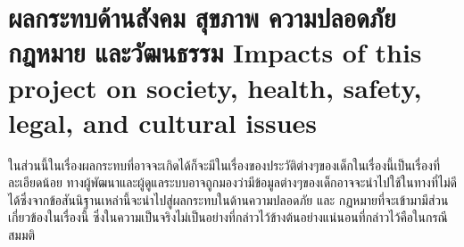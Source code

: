 \section{\ifcpe%
ผลกระทบด้านสังคม สุขภาพ ความปลอดภัย กฎหมาย และวัฒนธรรม
\else%
Impacts of this project on society, health, safety, legal, and cultural issues
\fi}

ในส่วนนี้ในเรื่องผลกระทบที่อาจจะเกิดได้ก็จะมีในเรื่องของประวัติต่างๆของเด็กในเรื่องนี้เป็นเรื่องที่ละเอียดน้อย ทางผู้พัฒนาและผู้ดูแลระบบอาจถูกมองว่ามีข้อมูลต่างๆของเด็กอาจจะนำไปใช้ในทางที่ไม่ดีได้ซึ่งจากข้อสันนิฐานเหล่านี้จะนำไปสู่ผลกระทบในด้านความปลอดภัย และ กฏหมายที่จะเข้ามามีส่วนเกี่ยวข้องในเรื่องนี้ ซึ่งในความเป็นจริงไม่เป็นอย่างที่กล่าวไว้ข้างต้นอย่างแน่นอนที่กล่าวไว้คือในกรณีสมมติ
